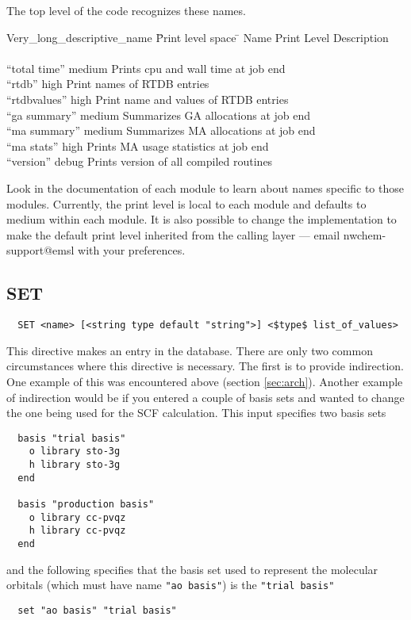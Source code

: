 The top level of the code recognizes these names. 
\begin{tabbing}
  Very\_long\_descriptive\_name \= Print level space \= \kill
  Name                   \> Print Level \> Description \\
                         \>        \> \\
 ``total time''        \> medium \> Prints cpu and wall time at job end\\
 ``rtdb''              \> high    \> Print names of RTDB entries\\
 ``rtdbvalues''        \> high    \> Print name and values of RTDB entries\\
 ``ga summary''        \> medium \> Summarizes GA allocations at job end \\
 ``ma summary''        \> medium \> Summarizes MA allocations at job end \\
 ``ma stats''          \> high   \> Prints MA usage statistics at job end \\
 ``version''           \> debug  \> Prints version of all compiled routines \\
\end{tabbing}

Look in the documentation of each module to learn about names specific
to those modules.  Currently, the print level is local to each module
and defaults to medium within each module.  It is also possible to
change the implementation to make the default print level inherited
from the calling layer --- email nwchem-support@emsl with your
preferences.

\subsection{SET}
\label{sec:set}

\begin{verbatim}
  SET <name> [<string type default "string">] <$type$ list_of_values>
\end{verbatim}

This directive makes an entry in the database.  There are only two
common circumstances where this directive is necessary.  The first is
to provide indirection.  One example of this was encountered above
(section \ref{sec:arch}).  Another example of indirection would be if
you entered a couple of basis sets and wanted to change the one being
used for the SCF calculation.  This input specifies two basis sets
\begin{verbatim}
  basis "trial basis"
    o library sto-3g
    h library sto-3g
  end

  basis "production basis"
    o library cc-pvqz
    h library cc-pvqz
  end
\end{verbatim}
and the following specifies that the basis set used to represent the
molecular orbitals (which must have name \verb+"ao basis"+) is the
\verb+"trial basis"+
\begin{verbatim}
  set "ao basis" "trial basis"
\end{verbatim}

